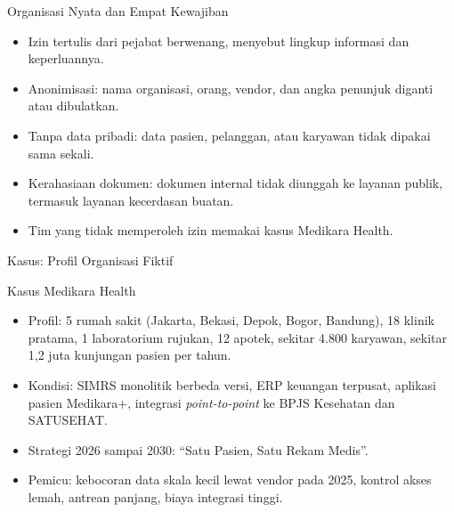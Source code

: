 \documentclass[aspectratio=169, table, 12pt]{beamer}
\begin{document}
\begin{frame}{{\Large Organisasi Nyata dan Empat Kewajiban}}
  \vspace{6pt}
  \small
  \begin{itemize}
    \item Izin tertulis dari pejabat berwenang, menyebut lingkup informasi dan keperluannya.
    \item Anonimisasi: nama organisasi, orang, vendor, dan angka penunjuk diganti atau dibulatkan.
    \item Tanpa data pribadi: data pasien, pelanggan, atau karyawan tidak dipakai sama sekali.
    \item Kerahasiaan dokumen: dokumen internal tidak diunggah ke layanan publik, termasuk layanan
          kecerdasan buatan.
    \item Tim yang tidak memperoleh izin memakai kasus Medikara Health.
  \end{itemize}
\end{frame}

\begin{frame}{{\Large Kasus: Profil Organisasi Fiktif}}
  \begin{block}{Kasus Medikara Health}
    \small
    \begin{itemize}
      \item Profil: 5 rumah sakit (Jakarta, Bekasi, Depok, Bogor, Bandung), 18 klinik pratama, 1
            laboratorium rujukan, 12 apotek, sekitar 4.800 karyawan, sekitar 1,2 juta kunjungan pasien
            per tahun.
      \item Kondisi: SIMRS monolitik berbeda versi, ERP keuangan terpusat, aplikasi pasien Medikara+,
            integrasi \textit{point-to-point} ke BPJS Kesehatan dan SATUSEHAT.
      \item Strategi 2026 sampai 2030: ``Satu Pasien, Satu Rekam Medis''.
      \item Pemicu: kebocoran data skala kecil lewat vendor pada 2025, kontrol akses lemah, antrean
            panjang, biaya integrasi tinggi.
    \end{itemize}
  \end{block}
\end{frame}
\end{document}
